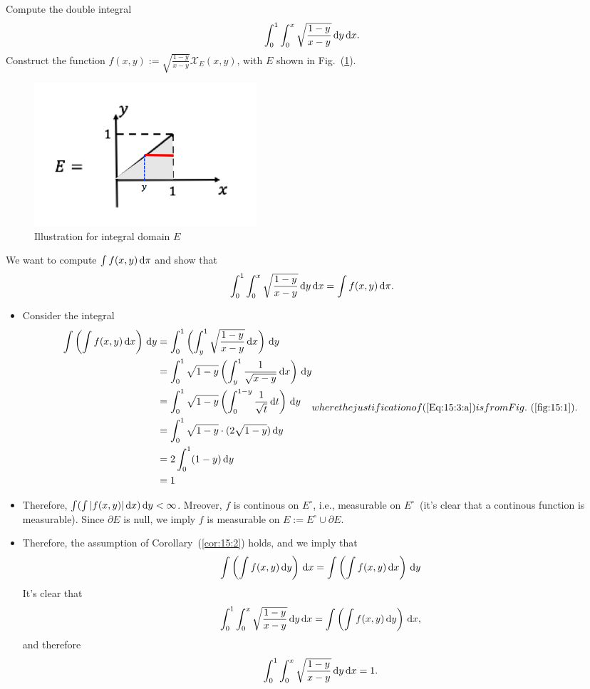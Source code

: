 \begin{example}
Compute the double integral
\[
\int_0^1\int_0^x\sqrt{\frac{1-y}{x-y}}\,\mathrm{d} y\,\mathrm{d} x.
\]
Construct the function $f(x,y):=\sqrt{\frac{1-y}{x-y}}\mathcal{X}_E(x,y)$, with $E$ shown in  Fig.~(\ref{fig:15:1}).
\begin{figure}[H]
\centering
\includegraphics[width=0.4\textwidth]{week15/f_40}
\caption{Illustration for integral domain $E$}
\label{fig:15:1}
\end{figure}
We want to compute $\int f(x,y)\,\mathrm{d}\pi$ and show that
\[
\int_0^1\int_0^x\sqrt{\frac{1-y}{x-y}}\,\mathrm{d} y\,\mathrm{d} x = \int f(x,y)\,\mathrm{d}\pi.
\]
\begin{itemize}
\item
Consider the integral
\begin{subequations}
\begin{align}
\int\left(\int f(x,y)\diff x\right)\diff y &=\int_0^1\left(
\int_y^1\sqrt{\frac{1-y}{x-y}}\diff x
\right)\diff y\label{Eq:15:3:a}\\&=\int_0^1\sqrt{1-y}\left(\int_y^1\frac{1}{\sqrt{x-y}}\diff x\right)\diff y\\
&=\int_0^1\sqrt{1-y}\left(
\int_0^{1-y}\frac{1}{\sqrt{t}}\diff t
\right)\diff y\\
&=\int_0^1\sqrt{1-y}\cdot(2\sqrt{1-y})\diff y\\
&=2\int_0^1(1-y)\diff y\\
&=1
\end{align}
where the justification of (\ref{Eq:15:3:a}) is from Fig.~(\ref{fig:15:1}).
\end{subequations}
\item
Therefore, $\int(\int|f(x,y)|\,\mathrm{d} x)\,\mathrm{d} y<\infty$. Mreover, $f$ is continous on $E^\circ$, i.e., measurable on $E^\circ$~(it's clear that a continous function is measurable). Since $\partial E$ is null, we imply $f$ is measurable on $E:=E^\circ\cup\partial E$.
\item
Therefore, the assumption of Corollary~(\ref{cor:15:2}) holds, and we imply that
\[
\int\left(\int f(x,y)\,\mathrm{d} y\right)\,\mathrm{d} x = \int\left(\int f(x,y)\,\mathrm{d} x\right)\,\mathrm{d} y
\]
It's clear that 
\[
\int_0^1\int_0^x\sqrt{\frac{1-y}{x-y}}\,\mathrm{d} y\,\mathrm{d} x = \int\left(\int f(x,y)\,\mathrm{d} y\right)\,\mathrm{d} x,
\]
and therefore
\[
\int_0^1\int_0^x\sqrt{\frac{1-y}{x-y}}\,\mathrm{d} y\,\mathrm{d} x = 1.
\]
\end{itemize}
\end{example}

